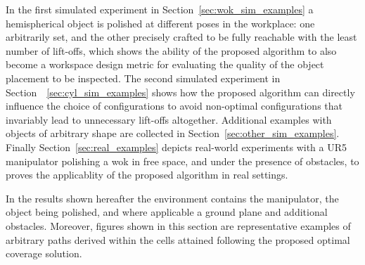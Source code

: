 \documentclass[journal]{IEEEtran}
\begin{document}
In the first simulated experiment in Section~\ref{sec:wok_sim_examples} a hemispherical object is polished at different poses in the workplace: one arbitrarily set, and the other precisely crafted to be fully reachable with the least number of lift-offs, which shows the ability of the proposed algorithm to also become a workspace design metric for evaluating the quality of the object placement to be inspected. 
The second simulated experiment in Section~~\ref{sec:cyl_sim_examples} shows how the proposed algorithm can directly influence the choice of configurations 
to avoid non-optimal configurations that invariably lead to unnecessary lift-offs altogether.
Additional examples with objects of arbitrary shape are collected in Section~\ref{sec:other_sim_examples}.
Finally Section~\ref{sec:real_examples} depicts real-world experiments with a UR5 manipulator polishing a wok 
in free space, and under the presence of obstacles, to proves the applicablity of the proposed algorithm in real settings. 


In the results shown hereafter 
the environment contains the manipulator, the object being polished, and where applicable a ground plane and additional obstacles. 
Moreover, figures shown in this section are representative examples of arbitrary paths derived within the cells attained following the proposed optimal coverage solution. 
\end{document}
